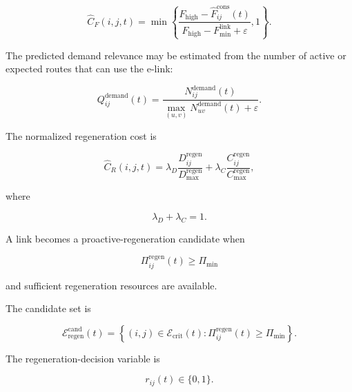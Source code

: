 \begin{equation}
    \widehat{C}_{F}(i,j,t)
    =
    \min
    \left\{
    \frac{
    F_{\mathrm{high}}
    -
    \widehat{F}_{ij}^{\mathrm{cons}}(t)
    }{
    F_{\mathrm{high}}
    -
    F_{\min}^{\mathrm{link}}
    +
    \varepsilon
    },
    1
    \right\}.
\end{equation}

The predicted demand relevance may be estimated from the number of active or expected routes that can use the e-link:

\begin{equation}
    Q_{ij}^{\mathrm{demand}}(t)
    =
    \frac{
    N_{ij}^{\mathrm{demand}}(t)
    }{
    \max_{(u,v)}
    N_{uv}^{\mathrm{demand}}(t)
    +
    \varepsilon
    }.
\end{equation}

The normalized regeneration cost is

\begin{equation}
    \widehat{C}_{R}(i,j,t)
    =
    \lambda_D
    \frac{
    D_{ij}^{\mathrm{regen}}
    }{
    D_{\max}^{\mathrm{regen}}
    }
    +
    \lambda_C
    \frac{
    C_{ij}^{\mathrm{regen}}
    }{
    C_{\max}^{\mathrm{regen}}
    },
\end{equation}

where

\begin{equation}
    \lambda_D+\lambda_C=1.
\end{equation}

A link becomes a proactive-regeneration candidate when

\begin{equation}
    \Pi_{ij}^{\mathrm{regen}}(t)
    \geq
    \Pi_{\min}
\end{equation}

and sufficient regeneration resources are available.

The candidate set is

\begin{equation}
    \mathcal{E}_{\mathrm{regen}}^{\mathrm{cand}}(t)
    =
    \left\{
    (i,j)
    \in
    \mathcal{E}_{\mathrm{crit}}(t)
    :
    \Pi_{ij}^{\mathrm{regen}}(t)
    \geq
    \Pi_{\min}
    \right\}.
\end{equation}

The regeneration-decision variable is

\begin{equation}
    r_{ij}(t)
    \in
    \{0,1\}.
\end{equation}


